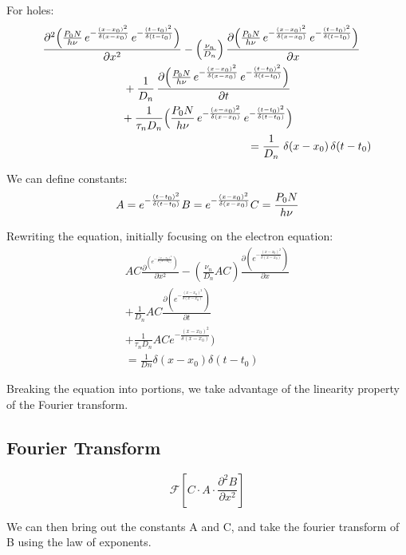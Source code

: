 \documentclass[
  journal,
]{IEEEtran}%
\begin{document}
For holes: \[
\begin{multlined}
\frac{\partial^2\Bigl(\frac{P_0 N}{h\nu}
\,e^{-\frac{(x - x_0)^2}{\delta(x - x_0)}}
\,e^{-\frac{(t - t_0)^2}{\delta(t - t_0)}}\Bigr)}%
{\partial x^2}
- \Bigl(\tfrac{\nu_{n}}{D_{n}}\Bigr)\,
  \frac{\partial\Bigl(\frac{P_0 N}{h\nu}
  \,e^{-\frac{(x - x_0)^2}{\delta(x - x_0)}}
  \,e^{-\frac{(t - t_0)^2}{\delta(t - t_0)}}\Bigr)}%
  {\partial x}
\\
+ \frac{1}{D_{n}}\,
  \frac{\partial\Bigl(\frac{P_0 N}{h\nu}
  \,e^{-\frac{(x - x_0)^2}{\delta(x - x_0)}}
  \,e^{-\frac{(t - t_0)^2}{\delta(t - t_0)}}\Bigr)}%
  {\partial t}
\\
+ \frac{1}{\tau_{n}D_{n}}
  \Bigl(\frac{P_0 N}{h\nu}
  \,e^{-\frac{(x - x_0)^2}{\delta(x - x_0)}}
  \,e^{-\frac{(t - t_0)^2}{\delta(t - t_0)}}\Bigr)
\\
= \frac{1}{D_{n}}\;\delta(x - x_{0})\,\delta(t - t_{0})
\end{multlined}
\]

We can define constants: \[
A = e^{-\frac{(t - t_0)^2}{\delta(t - t_0)}}\\
B =   e^{-\frac{(x - x_0)^2}{\delta(x - x_0)}}\\
C = {\frac{P_0 N}{h \nu}}
\]

Rewriting the equation, initially focusing on the electron equation: \[
\begin{multlined}
AC \frac{\partial^(
e^{-\frac{(x - x_0)^2}{\delta(x - x_0)}}
)}{\partial x^{2}}-\left( \frac{\nu_{n}}{D_{n}}AC\right)\frac{\partial(
e^{-\frac{(x - x_0)^2}{\delta(x - x_0)}}
)}{\partial x}
\\
+
\frac{1}{D_{n}} AC\frac{\partial (
e^{-\frac{(x - x_0)^2}{\delta(x - x_0)}}
)}{\partial t}
\\
+
\frac{1}{\tau_{n}D_{n}}AC
e^{-\frac{(x - x_0)^2}{\delta(x - x_0)}}
)
\\
=\frac{1}{Dn}\delta(x-x_{0})\delta(t-t_{0})
\end{multlined}
\]

Breaking the equation into portions, we take advantage of the linearity
property of the Fourier transform.

\subsection{Fourier Transform}\label{fourier-transform}

\[
\mathcal{F} \left[ C \cdot A \cdot \frac{\partial^2 B}{\partial x^2} \right]
\]

We can then bring out the constants A and C, and take the fourier
transform of B using the law of exponents.
\end{document}
